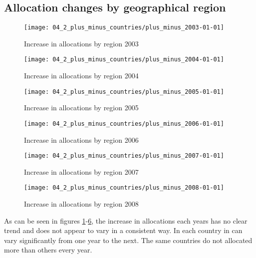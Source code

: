 \subsection{Allocation changes by geographical region}
\begin{figure}[htbp]
 	\centering
 		\texttt{[image: 04\_2\_plus\_minus\_countries/plus\_minus\_2003-01-01]}
	\caption{Increase in allocations by region 2003}
 	\label{fig:increase2003}
\end{figure}
\begin{figure}[htbp]
 	\centering
 		\texttt{[image: 04\_2\_plus\_minus\_countries/plus\_minus\_2004-01-01]}
	\caption{Increase in allocations by region 2004}
 	\label{fig:increase2004}
\end{figure}
\begin{figure}[htbp]
 	\centering
 		\texttt{[image: 04\_2\_plus\_minus\_countries/plus\_minus\_2005-01-01]}
	\caption{Increase in allocations by region 2005}
 	\label{fig:increase2005}
\end{figure}
\begin{figure}[htbp]
 	\centering
 		\texttt{[image: 04\_2\_plus\_minus\_countries/plus\_minus\_2006-01-01]}
	\caption{Increase in allocations by region 2006}
 	\label{fig:increase2006}
\end{figure}
\begin{figure}[htbp]
 	\centering
 		\texttt{[image: 04\_2\_plus\_minus\_countries/plus\_minus\_2007-01-01]}
	\caption{Increase in allocations by region 2007}
 	\label{fig:increase2007}
\end{figure}
\begin{figure}[htbp]
 	\centering
 		\texttt{[image: 04\_2\_plus\_minus\_countries/plus\_minus\_2008-01-01]}
	\caption{Increase in allocations by region 2008}
 	\label{fig:increase2008}
\end{figure}
As can be seen in figures \ref{fig:increase2003}-\ref{fig:increase2008}, the increase in allocations each years has no clear trend and does not appear to vary in a consistent way. In each country in can vary significantly from one year to the next. The same countries do not allocated more than others every year. 
